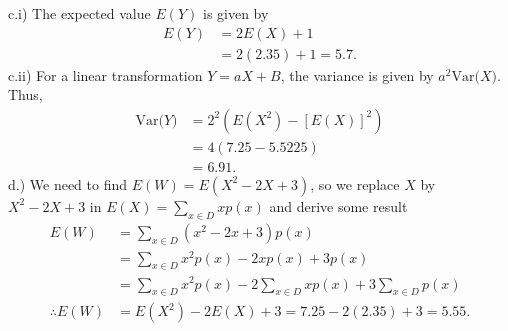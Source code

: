 \documentclass{report}
\begin{document}
 \bigbreak \noindent 
 c.i) The expected value $E(Y)$ is given by
 \begin{align*}
     E(Y) &= 2E(X) + 1 \\
     &=2(2.35) + 1 =5.7
 .\end{align*}
 \bigbreak \noindent 
 c.ii) For a linear transformation $Y = aX + B $, the variance is given by $a^{2}\text{Var($X$)} $. Thus,
 \begin{align*}
     \text{Var($Y$)} &= 2^{2}\left(E(X^{2}) - [E(X)]^{2}\right) \\
     &= 4\left(7.25 - 5.5225\right) \\
     &=6.91
 .\end{align*}
 \bigbreak \noindent 
 d.) We need to find $E(W) = E(X^{2} -2X + 3)$, so we replace $X$ by $X^{2} -2X+3 $ in $E(X) = \sum_{x\in D}xp(x)$ and derive some result
 \begin{align*}
     E(W) &= \sum_{x\in D}(x^{2} - 2x + 3)p(x) \\
     &=\sum_{x\in D}x^{2}p(x) -2xp(x)  + 3p(x) \\
     &=\sum_{x\in D}x^{2}p(x) - 2\sum_{x\in D}xp(x) + 3\sum_{x\in D}p(x) \\
     \therefore E(W) &= E(X^{2}) -2E(X) + 3  =7.25 -2(2.35) + 3 = 5.55
 .\end{align*}
\end{document}
